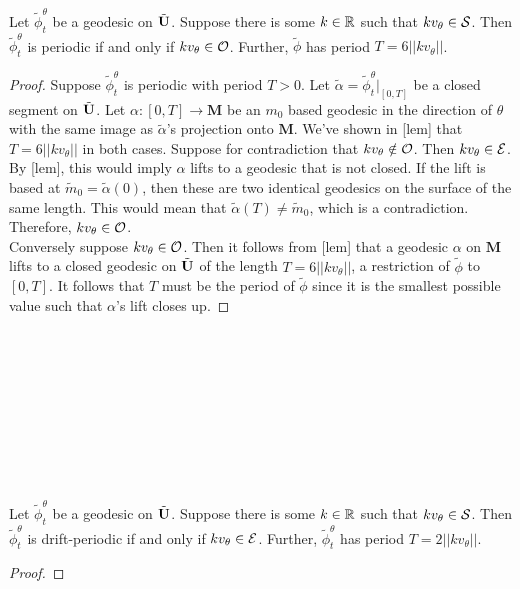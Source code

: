 \documentclass[]{article}
\def\bM{\mathbf{M}}
\def\mtild{\tilde{m}_0}
\def\tildphi{\tilde{\phi}}
\begin{document}
\begin{thm}
Let $\tildphi_t^\theta$ be a geodesic on $\tilde{\mathbf{U}}$. Suppose there is some $k\in\mathbb{R}$ such that $kv_\theta\in\mathcal{S}$. Then $\tildphi_t^\theta$ is periodic if and only if $kv_\theta\in\mathcal{O}$. Further, $\tildphi$ has period $T=6||kv_\theta||$.
\begin{proof}
Suppose $\tildphi_t^\theta$ is periodic with period $T>0$. Let $\tilde{\alpha}=\tildphi_t^\theta\vert_{[0,T]}$ be a closed segment on $\tilde{\mathbf{U}}$. Let $\alpha:[0,T]\rightarrow\bM$ be an $m_0$ based geodesic in the direction of $\theta$ with the same image as $\tilde{\alpha}$'s projection onto $\bM$. We've shown in [lem] that $T=6||kv_\theta||$ in both cases. Suppose for contradiction that $kv_\theta\notin\mathcal{O}$. Then $kv_\theta\in\mathcal{E}$. By [lem], this would imply $\alpha$ lifts to a geodesic that is not closed. If the lift is based at $\mtild=\tilde{\alpha}(0)$, then these are two identical geodesics on the surface of the same length. This would mean that $\tilde{\alpha}(T)\neq \mtild$, which is a contradiction. Therefore, $kv_\theta\in\mathcal{O}$.\\
Conversely suppose $kv_\theta\in\mathcal{O}$. Then it follows from [lem] that a geodesic $\alpha$ on $\bM$ lifts to a closed geodesic on $\tilde{\mathbf{U}}$ of the length $T=6||kv_\theta||$, a restriction of $\tildphi$ to $[0,T]$. It follows that $T$ must be the period of $\tildphi$ since it is the smallest possible value such that $\alpha$'s lift closes up.  
\end{proof}
\end{thm}
~\\\\\\\\\\\\\\\\
\begin{thm}
Let $\tildphi_t^\theta$ be a geodesic on $\tilde{\mathbf{U}}$. Suppose there is some $k\in\mathbb{R}$ such that $kv_\theta\in\mathcal{S}$. Then $\tildphi_t^\theta$ is drift-periodic if and only if $kv_\theta\in\mathcal{E}$. Further, $\tildphi_t^\theta$ has period $T=2||kv_\theta||$.
\begin{proof}

\end{proof}
\end{thm}

\newpage
\end{document}

